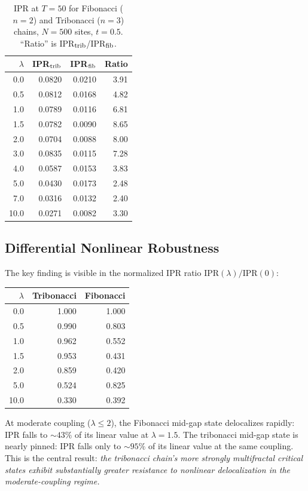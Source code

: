 \documentclass[12pt,a4paper]{article}
\begin{document}
\begin{table}[h]
\centering
\caption{IPR at $T = 50$ for Fibonacci ($n=2$) and Tribonacci ($n=3$) chains,
$N = 500$ sites, $t = 0.5$. ``Ratio'' is IPR$_{\rm trib}$/IPR$_{\rm fib}$.}
\label{tab:ipr}
\begin{tabular}{r r r r}
\toprule
$\lambda$ & IPR$_{\rm trib}$ & IPR$_{\rm fib}$ & Ratio \\
\midrule
0.0  & 0.0820 & 0.0210 & 3.91 \\
0.5  & 0.0812 & 0.0168 & 4.82 \\
1.0  & 0.0789 & 0.0116 & 6.81 \\
1.5  & 0.0782 & 0.0090 & 8.65 \\
2.0  & 0.0704 & 0.0088 & 8.00 \\
3.0  & 0.0835 & 0.0115 & 7.28 \\
4.0  & 0.0587 & 0.0153 & 3.83 \\
5.0  & 0.0430 & 0.0173 & 2.48 \\
7.0  & 0.0316 & 0.0132 & 2.40 \\
10.0 & 0.0271 & 0.0082 & 3.30 \\
\bottomrule
\end{tabular}
\end{table}

\subsection{Differential Nonlinear Robustness}

The key finding is visible in the normalized IPR ratio
$\mathrm{IPR}(\lambda)/\mathrm{IPR}(0)$:

\begin{center}
\begin{tabular}{r r r}
\toprule
$\lambda$ & Tribonacci & Fibonacci \\
\midrule
0.0 & 1.000 & 1.000 \\
0.5 & 0.990 & 0.803 \\
1.0 & 0.962 & 0.552 \\
1.5 & 0.953 & 0.431 \\
2.0 & 0.859 & 0.420 \\
5.0 & 0.524 & 0.825 \\
10.0 & 0.330 & 0.392 \\
\bottomrule
\end{tabular}
\end{center}

At moderate coupling ($\lambda \leq 2$), the Fibonacci mid-gap state
delocalizes rapidly: IPR falls to $\sim 43\%$ of its linear value at
$\lambda = 1.5$. The tribonacci mid-gap state is nearly pinned: IPR falls
only to $\sim 95\%$ of its linear value at the same coupling. This is the
central result: \emph{the tribonacci chain's more strongly multifractal
critical states exhibit substantially greater resistance to nonlinear
delocalization in the moderate-coupling regime.}
\end{document}
